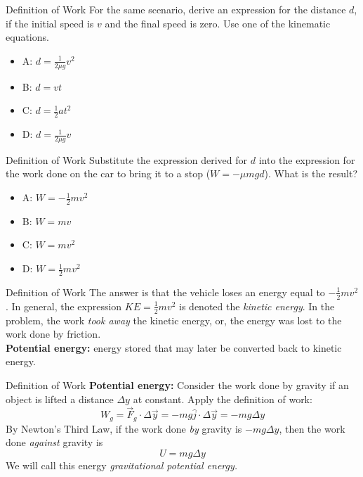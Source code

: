 \documentclass{beamer}
\begin{document}
\begin{frame}{Definition of Work}
For the same scenario, derive an expression for the distance $d$, if the initial speed is $v$ and the final speed is zero.  Use one of the kinematic equations.
\begin{itemize}
\item A: $d = \frac{1}{2\mu g} v^2$
\item B: $d = vt$
\item C: $d = \frac{1}{2}at^2$
\item D: $d = \frac{1}{2\mu g} v$
\end{itemize}
\end{frame}

\begin{frame}{Definition of Work}
Substitute the expression derived for $d$ into the expression for the work done on the car to bring it to a stop ($W = -\mu m g d$).  What is the result?
\begin{itemize}
\item A: $W = -\frac{1}{2} m v^2$
\item B: $W = mv$
\item C: $W = mv^2$
\item D: $W = \frac{1}{2} m v^2$
\end{itemize}
\end{frame}

\begin{frame}{Definition of Work}
The answer is that the vehicle loses an energy equal to $-\frac{1}{2}mv^2$.  In general, the expression $KE = \frac{1}{2}mv^2$ is denoted the \textit{kinetic energy}.  In the problem, the work \textit{took away} the kinetic energy, or, the energy was lost to the work done by friction. \\ \vspace{1cm}
\textbf{Potential energy:} energy stored that may later be converted back to kinetic energy.
\end{frame}

\begin{frame}{Definition of Work}
\textbf{Potential energy:}
Consider the work done by gravity if an object is lifted a distance $\Delta y$ at constant.  Apply the definition of work:
\begin{equation}
W_g = \vec{F}_g \cdot \Delta \vec{y} = -mg \hat{j} \cdot \Delta \vec{y} = -mg\Delta y
\end{equation}
By Newton's Third Law, if the work done \textit{by} gravity is $-mg\Delta y$, then the work done \textit{against} gravity is
\begin{equation}
U = m g \Delta y
\end{equation}
We will call this energy \textit{gravitational potential energy.}
\end{frame}
\end{document}
